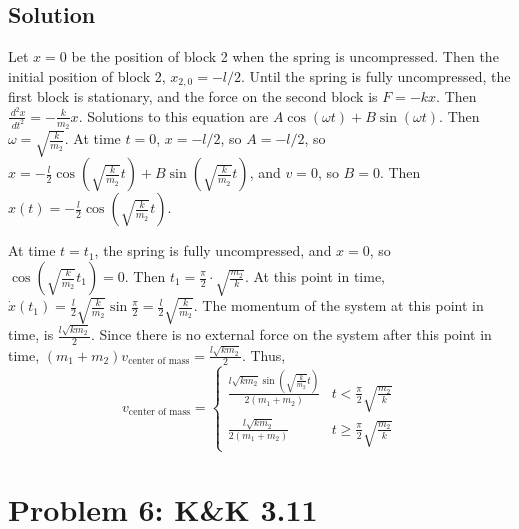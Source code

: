\documentclass[solutions]{esg8012pset}
\renewcommand{\d}{\,d}
\begin{document}
\subsection*{Solution}
  Let $x = 0$ be the position of block 2 when the spring is uncompressed.  Then the initial position of block 2, $x_{2,0} = -l/2$.  Until the spring is fully uncompressed, the first block is stationary, and the force on the second block is $F = -kx$.  Then $\frac{\d^2 x}{\d t^2} = -\frac{k}{m_2}x$.  Solutions to this equation are $A\cos(\omega t) + B\sin(\omega t)$.  Then $\omega = \sqrt{\frac{k}{m_2}}$.  At time $t = 0$, $x = -l/2$, so $A = -l/2$, so $x = -\frac{l}{2}\cos\left(\sqrt{\frac{k}{m_2}} t\right) + B\sin\left(\sqrt{\frac{k}{m_2}}t\right)$, and $v = 0$, so $B = 0$.  Then $x(t) = -\frac{l}{2}\cos\left(\sqrt{\frac{k}{m_2}} t\right)$.

  At time $t = t_1$, the spring is fully uncompressed, and $x = 0$, so $\cos\left(\sqrt{\frac{k}{m_2}} t_1 \right) = 0$.  Then $t_1 = \frac{\pi}{2}\cdot \sqrt{\frac{m_2}{k}}$.  At this point in time, $\dot x(t_1) = \frac{l}{2}\sqrt{\frac{k}{m_2}}\sin\frac{\pi}{2} = \frac{l}{2}\sqrt{\frac{k}{m_2}}$.  The momentum of the system at this point in time, is $\frac{l\sqrt{k m_2}}{2}$.  Since there is no external force on the system after this point in time, $(m_1 + m_2)v_{\text{center of mass}} = \frac{l\sqrt{k m_2}}{2}$.  Thus, $$v_{\text{center of mass}} = \begin{cases} \frac{l\sqrt{k m_2}\sin\left(\sqrt{\frac{k}{m_2}} t\right)}{2(m_1 + m_2)} & t < \frac{\pi}{2}\sqrt{\frac{m_2}{k}} \\ \frac{l\sqrt{k m_2}}{2(m_1 + m_2)} & t \geq \frac{\pi}{2}\sqrt{\frac{m_2}{k}} \end{cases}$$
\section*{Problem 6: K\&K 3.11}
\end{document}
